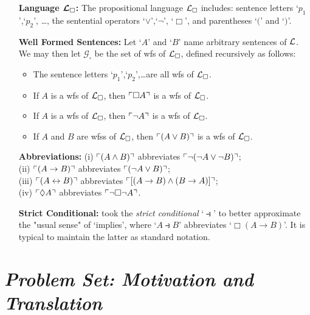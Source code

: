 \documentclass[a4paper, 11pt]{article} %
\begin{document}
\begin{enumerate}[leftmargin=1.2in,labelsep=.15in] 
\item[\bf Language $\boldsymbol{\mathcal{L}_\square}$:] The propositional language $\mathcal{L}_\square$ includes: sentence letters `$p_1$',`$p_2$', \dots, the sentential operators `$\vee$',`$\neg$', `$\Box$', and parentheses `$($' and `$)$'.
\item[\bf Well Formed Sentences:] Let `$A$' and `$B$' name arbitrary sentences of $\mathcal{L}$. We may then let $\mathcal{G}_\square$ be the set of wfs of $\mathcal{L}_\square$, defined recursively as follows:
\begin{itemize}
\item The sentence letters `$p_1$',`$p_2$',\dots are all wfs of $\mathcal{L}_\square$. 
\item If ${A}$ is a wfs of $\mathcal{L}_\square$, then $\ulcorner\Box A\urcorner$ is a wfs of $\mathcal{L}_\square$.
\item If ${A}$ is a wfs of $\mathcal{L}_\square$, then $\ulcorner\neg A\urcorner$ is a wfs of $\mathcal{L}_\square$.
\item If ${A}$ and ${B}$ are wfss of $\mathcal{L}_\square$, then $\ulcorner(A\vee B)\urcorner$ is a wfs of $\mathcal{L}_\square$.
\end{itemize}
\item[\bf Abbreviations:] (i) $\ulcorner(A\wedge B)\urcorner$ abbreviates $\ulcorner\neg(\neg A\vee\neg B)\urcorner$;\\ (ii) $\ulcorner(A\rightarrow B)\urcorner$ abbreviates $\ulcorner(\neg A\vee B)\urcorner$;\\ (iii) $\ulcorner(A\leftrightarrow B)\urcorner$ abbreviates $\ulcorner[(A\rightarrow B)\wedge(B\rightarrow A)]\urcorner$;\\ (iv) $\ulcorner\Diamond A\urcorner$ abbreviates $\ulcorner\neg\Box\neg A\urcorner$.
\item[\bf Strict Conditional:] \citet{Lewis1932} took the \textit{strict conditional} `$\strictif$' to better approximate the "usual sense" of `implies', where `$A\strictif B$' abbreviates `$\Box(A\rightarrow B)$'. It is typical to maintain the latter as standard notation. 
\end{enumerate}


\section*{\it Problem Set: Motivation and Translation}
\end{document}
